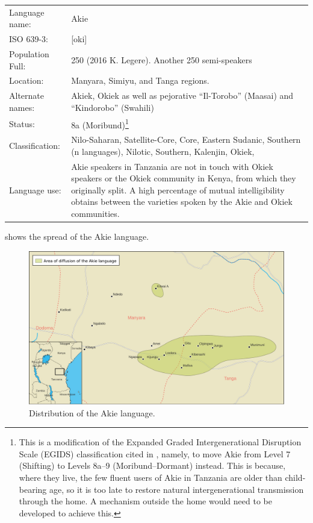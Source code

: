 \documentclass[output=paper,colorlinks,citecolor=brown]{langscibook}
\begin{document}
\ea\begin{tabularx}{\linewidth}[t]{lQ}
Language name: & Akie \\
ISO 639-3: &  	 [oki] \\
Population Full:	&  250 (2016 K. Legere). Another 250 semi-speakers \\
Location:	& 	Manyara, Simiyu, and Tanga regions. \\
Alternate names: & Akiek, Okiek as well as pejorative “Il-Torobo” (Maasai) and “Kindorobo” (Swahili) \\
Status: & 	8a (Moribund)\footnote{This is a modification of the Expanded Graded Intergenerational Disruption Scale (EGIDS) classification cited in \citet[7]{SimonsFennig2018}, namely, to move Akie from Level 7 (Shifting) to Levels 8a–9 (Moribund–Dormant) instead. This is because, where they live, the few fluent users of Akie in Tanzania are older than child-bearing age, so it is too late to restore natural intergenerational transmission through the home. A mechanism outside the home would need to be developed to achieve this. } \\
Classification:	 & Nilo-Saharan, Satellite-Core, Core, Eastern Sudanic, Southern (n languages), Nilotic, Southern, Kalenjin, Okiek, \\
Language use: & 	Akie speakers in Tanzania are not in touch with Okiek speakers or the Okiek community in Kenya, from which they originally split. A high percentage of mutual intelligibility obtains between the varieties spoken by the Akie and Okiek communities. \\
\end{tabularx}
\z

\noindent{} shows the spread of the Akie language.



\begin{figure}
    \includegraphics[width=\textwidth]{figures/akie_language_map.pdf}
    \caption{Distribution of the Akie language.\label{fig:legere:1}}
\end{figure}
\end{document}

